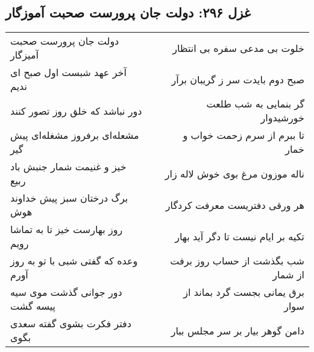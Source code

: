 \begin{center}
\section*{غزل ۲۹۶: دولت جان پرورست صحبت آموزگار}
\label{sec:296}
\begin{longtable}{l p{0.5cm} r}
دولت جان پرورست صحبت آمیزگار
&&
خلوت بی مدعی سفره بی انتظار
\\
آخر عهد شبست اول صبح ای ندیم
&&
صبح دوم بایدت سر ز گریبان برآر
\\
دور نباشد که خلق روز تصور کنند
&&
گر بنمایی به شب طلعت خورشیدوار
\\
مشعله‌ای برفروز مشغله‌ای پیش گیر
&&
تا ببرم از سرم زحمت خواب و خمار
\\
خیز و غنیمت شمار جنبش باد ربیع
&&
ناله موزون مرغ بوی خوش لاله زار
\\
برگ درختان سبز پیش خداوند هوش
&&
هر ورقی دفتریست معرفت کردگار
\\
روز بهارست خیز تا به تماشا رویم
&&
تکیه بر ایام نیست تا دگر آید بهار
\\
وعده که گفتی شبی با تو به روز آورم
&&
شب بگذشت از حساب روز برفت از شمار
\\
دور جوانی گذشت موی سیه پیسه گشت
&&
برق یمانی بجست گرد بماند از سوار
\\
دفتر فکرت بشوی گفته سعدی بگوی
&&
دامن گوهر بیار بر سر مجلس ببار
\\
\end{longtable}
\end{center}
